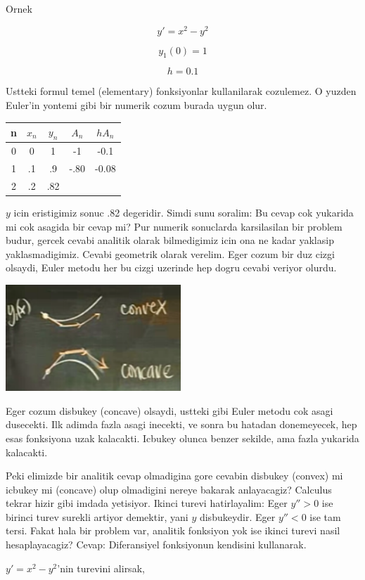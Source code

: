 \documentclass[12pt,fleqn]{article}
\begin{document}
Ornek

\[ y' = x^2 - y^2 \]

\[ y_1(0) = 1 \]

\[ h = 0.1 \]

Ustteki formul temel (elementary) fonksiyonlar kullanilarak cozulemez. O yuzden
Euler'in yontemi gibi bir numerik cozum burada uygun olur. 

\begin{tabular}{ccccc}
n & $x_n$ & $y_n$ & $A_n$ & $hA_n$ \\
\hline
0 & 0 & 1 & -1 & -0.1 \\
\hline
1 & .1 & .9 & -.80 & -0.08 \\
\hline
2 & .2 & .82 &  & 
\end{tabular}

$y$ icin eristigimiz sonuc .82 degeridir. Simdi sunu soralim: Bu cevap cok
yukarida mi cok asagida bir cevap mi? Pur numerik sonuclarda karsilasilan bir
problem budur, gercek cevabi analitik olarak bilmedigimiz icin ona ne kadar
yaklasip yaklasmadigimiz. Cevabi geometrik olarak verelim. Eger cozum bir duz
cizgi olsaydi, Euler metodu her bu cizgi uzerinde hep dogru cevabi veriyor
olurdu. 

\includegraphics[height=4cm]{2_2.png}

Eger cozum disbukey (concave) olsaydi, ustteki gibi Euler metodu cok asagi
dusecekti. Ilk adimda fazla asagi inecekti, ve sonra bu hatadan donemeyecek, hep
esas fonksiyona uzak kalacakti. Icbukey olunca benzer sekilde, ama fazla
yukarida kalacakti. 

Peki elimizde bir analitik cevap olmadigina gore cevabin disbukey (convex) mi
icbukey mi (concave) olup olmadigini nereye bakarak anlayacagiz? Calculus tekrar
hizir gibi imdada yetisiyor. Ikinci turevi hatirlayalim: Eger $y'' > 0$ ise
birinci turev surekli artiyor demektir, yani $y$ disbukeydir. Eger $y'' < 0$ ise
tam tersi. Fakat hala bir problem var, analitik fonksiyon yok ise ikinci turevi
nasil hesaplayacagiz? Cevap: Diferansiyel fonksiyonun kendisini kullanarak.

$y' = x^2 - y^2$'nin turevini alirsak, 
\end{document}
